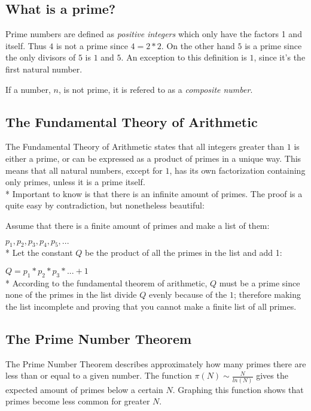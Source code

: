 \documentclass[main.tex]{subfiles}
\begin{document}
\subsection{What is a prime?}
Prime numbers are defined as \textit{positive integers} which only have the factors 1 and itself. Thus $4$ is not a prime since $4 = 2 * 2$. On the other hand $5$ is a prime since the only divisors of $5$ is $1$ and $5$. An exception to this definition is $1$, since it's the first natural number.

If a number, $n$, is not prime, it is refered to as a \textit{composite number}.

\subsection{The Fundamental Theory of Arithmetic}
The Fundamental Theory of Arithmetic \cite{theorem:arithmetic} states that all integers greater than $1$ is either a prime, or can be expressed as a product of primes in a unique way. This means that all natural numbers, except for $1$, has its own factorization containing only primes, unless it is a prime itself.
\newline
\\*
Important to know is that there is an infinite amount of primes. The proof is a quite easy by contradiction, but nonetheless beautiful:

\begin{mdframed}
    Assume that there is a finite amount of primes and make a list of them:

    $p_1, p_2, p_3, p_4, p_5, ...$ 
    \newline
    \\*
    Let the constant $Q$ be the product of all the primes in the list and add 1:

    $Q = p_1 * p_2 * p_3 * ... + 1$
    \newline
    \\*
    According to the fundamental theorem of arithmetic, $Q$ must be a prime since none of the primes in the list divide $Q$ evenly because of the $1$; therefore making the list incomplete and proving that you cannot make a finite list of all primes. 
\end{mdframed}

\subsection{The Prime Number Theorem}
The Prime Number Theorem \cite{theorem:prime_num} describes approximately how many primes there are less than or equal to a given number. The function $\pi(N) \sim \frac{N}{ln(N)}$ gives the expected amount of primes below a certain $N$. Graphing this function shows that primes become less common for greater $N$.
\end{document}
